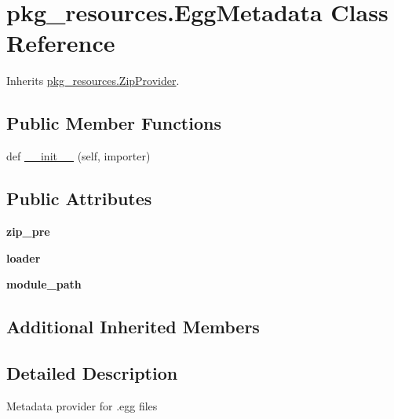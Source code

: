 \hypertarget{classpkg__resources_1_1_egg_metadata}{}\section{pkg\+\_\+resources.\+Egg\+Metadata Class Reference}
\label{classpkg__resources_1_1_egg_metadata}


Inherits \hyperlink{classpkg__resources_1_1_zip_provider}{pkg\+\_\+resources.\+Zip\+Provider}.

\subsection*{Public Member Functions}
\begin{DoxyCompactItemize}
\item 
def \hyperlink{classpkg__resources_1_1_egg_metadata_a389d7931032f53576de67963be4ec790}{\+\_\+\+\_\+init\+\_\+\+\_\+} (self, importer)
\end{DoxyCompactItemize}
\subsection*{Public Attributes}
\begin{DoxyCompactItemize}
\item 
\mbox{\label{classpkg__resources_1_1_egg_metadata_a5a1e0bd2d5340e574b3b532e8f21d363}} 
{\bfseries zip\+\_\+pre}
\item 
\mbox{\label{classpkg__resources_1_1_egg_metadata_abc7936ead6a706047cb2d52bf800557c}} 
{\bfseries loader}
\item 
\mbox{\label{classpkg__resources_1_1_egg_metadata_a41391e3d836916141fa95197550b1937}} 
{\bfseries module\+\_\+path}
\end{DoxyCompactItemize}
\subsection*{Additional Inherited Members}


\subsection{Detailed Description}
\begin{DoxyVerb}Metadata provider for .egg files\end{DoxyVerb}
 

